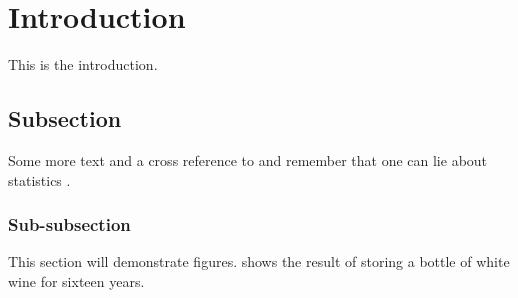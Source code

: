 \documentclass{ece}
\begin{document}
\tableofcontents


\listoffigures


\listoftables


\restoregeometry

\body

\section{Introduction}

This is the introduction.

\subsection{Subsection}

Some more text and a cross reference to  and remember that one can lie about statistics \cite{liewithstat}.

\subsubsection{Sub-subsection}

This section will demonstrate figures.   shows the result of storing a bottle of white wine for sixteen years.
\end{document}
